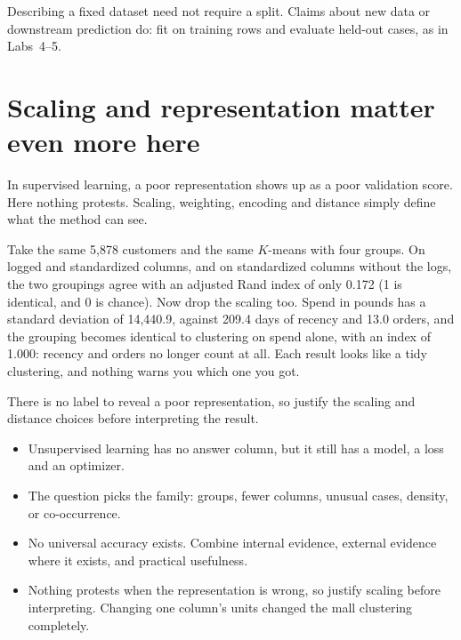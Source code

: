 Describing a fixed dataset need not require a split. Claims about new data or downstream prediction do: fit on training rows and evaluate held-out cases, as in Labs~4--5.

\section{Scaling and representation matter even more here}

In supervised learning, a poor representation shows up as a poor validation score. Here nothing protests. Scaling, weighting, encoding and distance simply define what the method can see.

\begin{workedexample}
Take the same 5,878 customers and the same $K$-means with four groups. On logged and standardized columns, and on standardized columns without the logs, the two groupings agree with an adjusted Rand index of only 0.172 (1 is identical, and 0 is chance). Now drop the scaling too. Spend in pounds has a standard deviation of 14,440.9, against 209.4 days of recency and 13.0 orders, and the grouping becomes identical to clustering on spend alone, with an index of 1.000: recency and orders no longer count at all. Each result looks like a tidy clustering, and nothing warns you which one you got.
\end{workedexample}

\begin{keyidea}
There is no label to reveal a poor representation, so justify the scaling and distance choices before interpreting the result.
\end{keyidea}

\begin{chapterrecap}
\begin{itemize}
  \item Unsupervised learning has no answer column, but it still has a model, a loss and an optimizer.
  \item The question picks the family: groups, fewer columns, unusual cases, density, or co-occurrence.
  \item No universal accuracy exists. Combine internal evidence, external evidence where it exists, and practical usefulness.
  \item Nothing protests when the representation is wrong, so justify scaling before interpreting. Changing one column's units changed the mall clustering completely.
\end{itemize}
\end{chapterrecap}

